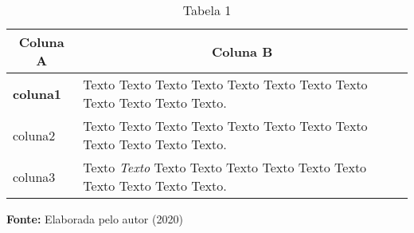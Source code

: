 

\begin{table}[ht]
\caption{Tabela 1}
\label{tbl:tabelaex}
\centering
{}
\begin{tabular}{p{6cm}p{9cm}}
\hline
\multicolumn{1}{c}{\textbf{Coluna A}} & \multicolumn{1}{c}{\textbf{Coluna B}}  \\
\hline     
\textbf{coluna1} & Texto Texto Texto Texto Texto Texto Texto Texto Texto Texto Texto Texto.
\\ 

coluna2 & Texto Texto Texto Texto Texto Texto Texto Texto Texto Texto Texto Texto.              
\\ 

coluna3 & Texto \textit{Texto} Texto Texto Texto Texto Texto Texto Texto Texto Texto Texto.     
\\ \hline

\end{tabular}

  \par\medskip\ABNTEXfontereduzida\selectfont\textbf{Fonte:} Elaborada pelo autor (2020) \par\medskip
\end{table}
